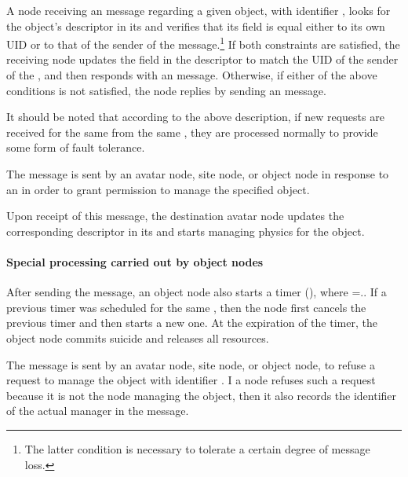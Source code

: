A node receiving an \oreq message regarding a given object, with
identifier \objUID, looks for the object's descriptor in its \vlist
and verifies that its \magNode field is equal either to its own UID or
to that of the sender of the \oreq message.\footnote{The latter
  condition is necessary to tolerate a certain degree of message
  loss.}   If both
constraints are satisfied, the receiving node updates the \magNode
field in the descriptor to match the UID of the sender of the \oreq,
and then responds with an \oack message. Otherwise, if either of the
above conditions is not satisfied, the node replies by sending an
\oref message.

It should be noted that according to the above description, if new
requests are received for the same \objUID from the same \reqNode,
they are processed normally to provide some form of fault tolerance. 

\msgentry{\oack}
\desc 

The message is sent by an avatar node, site node, or object node
in response to an \oreq in order to grant permission to manage the
specified object. 

Upon receipt of this message, the destination avatar node updates the
corresponding descriptor in its \vlist and starts managing physics for
the object. 

\paragraph{Special processing carried out by object nodes}
After sending the message, an object node also starts a timer
\delTimer(\objUID), where \objUID=\objDesc.\UID. If a previous timer
was scheduled for the same \objUID, then the node first cancels the
previous timer and then starts a new one.  At the expiration of the
timer, the object node commits suicide and releases all resources.



\msgentry{\oref}
\desc

The message is sent by an avatar node, site node, or object node, to
refuse a request to manage the object with identifier \objUID. I a
node refuses such a request because it is not the node managing the
object, then it also records the identifier of the actual manager in
the message. 

